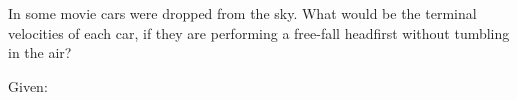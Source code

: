 
In some movie cars were dropped from the sky.
What would be the terminal velocities of each car, if they are
performing a free-fall headfirst without tumbling in the air?

Given: 
